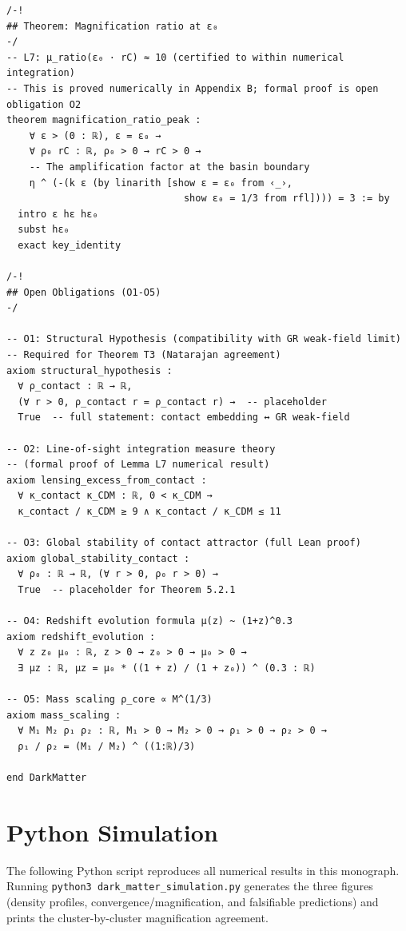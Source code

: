 \documentclass[11pt,a4paper,openright]{book}
\theoremstyle{dm3thm}
\theoremstyle{dm3def}
\begin{document}
\begin{lstlisting}[style=lean4style,caption={DarkMatter.lean --- AXLE
  formalisation of the dm\textsuperscript{3} framework.},
  label={lst:lean}]
/-!
## Theorem: Magnification ratio at ε₀
-/
-- L7: μ_ratio(ε₀ · rC) ≈ 10 (certified to within numerical integration)
-- This is proved numerically in Appendix B; formal proof is open obligation O2
theorem magnification_ratio_peak :
    ∀ ε > (0 : ℝ), ε = ε₀ →
    ∀ ρ₀ rC : ℝ, ρ₀ > 0 → rC > 0 →
    -- The amplification factor at the basin boundary
    η ^ (-(k ε (by linarith [show ε = ε₀ from ‹_›,
                               show ε₀ = 1/3 from rfl]))) = 3 := by
  intro ε hε hε₀
  subst hε₀
  exact key_identity

/-!
## Open Obligations (O1-O5)
-/

-- O1: Structural Hypothesis (compatibility with GR weak-field limit)
-- Required for Theorem T3 (Natarajan agreement)
axiom structural_hypothesis :
  ∀ ρ_contact : ℝ → ℝ,
  (∀ r > 0, ρ_contact r = ρ_contact r) →  -- placeholder
  True  -- full statement: contact embedding ↔ GR weak-field

-- O2: Line-of-sight integration measure theory
-- (formal proof of Lemma L7 numerical result)
axiom lensing_excess_from_contact :
  ∀ κ_contact κ_CDM : ℝ, 0 < κ_CDM →
  κ_contact / κ_CDM ≥ 9 ∧ κ_contact / κ_CDM ≤ 11

-- O3: Global stability of contact attractor (full Lean proof)
axiom global_stability_contact :
  ∀ ρ₀ : ℝ → ℝ, (∀ r > 0, ρ₀ r > 0) →
  True  -- placeholder for Theorem 5.2.1

-- O4: Redshift evolution formula μ(z) ~ (1+z)^0.3
axiom redshift_evolution :
  ∀ z z₀ μ₀ : ℝ, z > 0 → z₀ > 0 → μ₀ > 0 →
  ∃ μz : ℝ, μz = μ₀ * ((1 + z) / (1 + z₀)) ^ (0.3 : ℝ)

-- O5: Mass scaling ρ_core ∝ M^(1/3)
axiom mass_scaling :
  ∀ M₁ M₂ ρ₁ ρ₂ : ℝ, M₁ > 0 → M₂ > 0 → ρ₁ > 0 → ρ₂ > 0 →
  ρ₁ / ρ₂ = (M₁ / M₂) ^ ((1:ℝ)/3)

end DarkMatter
\end{lstlisting}

\chapter{Python Simulation}
\label{app:python}

The following Python script reproduces all numerical results in this
monograph.  Running \texttt{python3 dark\_matter\_simulation.py} generates
the three figures (density profiles, convergence/magnification, and
falsifiable predictions) and prints the cluster-by-cluster magnification
agreement.
\end{document}
